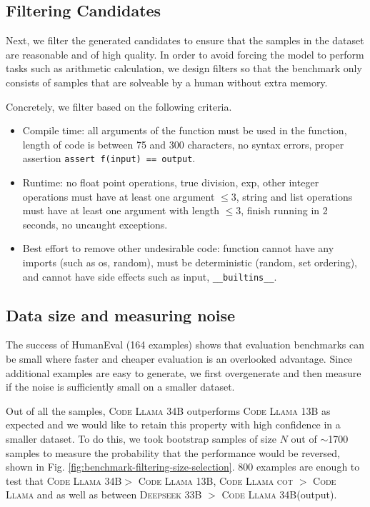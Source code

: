 \documentclass{article}
\newcommand{\codellamamed}{\textsc{Code Llama 13B}\xspace}
\newcommand{\codellamalarge}{\textsc{Code Llama 34B}\xspace}
\begin{document}
\subsection{Filtering Candidates} \label{subsec:filtering-candidates}
Next, we filter the generated candidates to ensure that the samples in the dataset are reasonable and of high quality. In order to avoid forcing the model to perform tasks such as arithmetic calculation, we design filters so that the benchmark only consists of samples that are solveable by a human without extra memory.

Concretely, we filter based on the following criteria. 
\begin{itemize}
    \item Compile time: all arguments of the function must be used in the function, length of code is between 75 and 300 characters, no syntax errors, proper assertion \texttt{assert f(input) == output}.

    \item Runtime: no float point operations, true division, exp, other integer operations must have at least one argument $\leq 3$, string and list operations must have at least one argument with length $\leq 3$, finish running in 2 seconds, no uncaught exceptions.

    \item Best effort to remove other undesirable code: function cannot have any imports (such as os, random), must be deterministic (random, set ordering), and cannot have side effects such as input, \texttt{\_\_builtins\_\_}.
\end{itemize}

\subsection{Data size and measuring noise} \label{subsec:data-size-noise}
The success of HumanEval (164 examples) shows that evaluation benchmarks can be small where faster and cheaper evaluation is an overlooked advantage. Since additional examples are easy to generate, we first overgenerate and then measure if the noise is sufficiently small on a smaller dataset. 


Out of all the samples, \codellamalarge outperforms \codellamamed as expected and we would like to retain this property with high confidence in a smaller dataset. To do this, we took bootstrap samples of size $N$ out of $\sim$1700 samples to measure the probability that the performance would be reversed, shown in Fig. \ref{fig:benchmark-filtering-size-selection}. 800 examples are enough to test that \codellamalarge $>$ \codellamamed, \textsc{Code Llama cot} $>$ \textsc{Code Llama} and  as well as between \textsc{Deepseek 33B} $>$ \codellamalarge (output).
\end{document}
